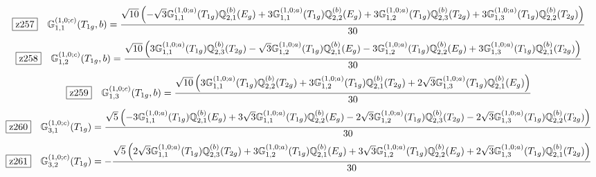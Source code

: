 \documentclass[fleqn,10pt,landscape]{jsarticle}
\begin{document}
\begin{dmath*}
\hspace*{3mm}\fbox{z257}\quad \mathbb{G}_{1,1}^{(1,0;c)}(T_{1g},b)=\frac{\sqrt{10} \left(- \sqrt{3} \mathbb{G}_{1,1}^{(1,0;a)}(T_{1g}) \mathbb{Q}_{2,1}^{(b)}(E_{g}) + 3 \mathbb{G}_{1,1}^{(1,0;a)}(T_{1g}) \mathbb{Q}_{2,2}^{(b)}(E_{g}) + 3 \mathbb{G}_{1,2}^{(1,0;a)}(T_{1g}) \mathbb{Q}_{2,3}^{(b)}(T_{2g}) + 3 \mathbb{G}_{1,3}^{(1,0;a)}(T_{1g}) \mathbb{Q}_{2,2}^{(b)}(T_{2g})\right)}{30}
\end{dmath*}
\begin{dmath*}
\hspace*{3mm}\fbox{z258}\quad \mathbb{G}_{1,2}^{(1,0;c)}(T_{1g},b)=\frac{\sqrt{10} \left(3 \mathbb{G}_{1,1}^{(1,0;a)}(T_{1g}) \mathbb{Q}_{2,3}^{(b)}(T_{2g}) - \sqrt{3} \mathbb{G}_{1,2}^{(1,0;a)}(T_{1g}) \mathbb{Q}_{2,1}^{(b)}(E_{g}) - 3 \mathbb{G}_{1,2}^{(1,0;a)}(T_{1g}) \mathbb{Q}_{2,2}^{(b)}(E_{g}) + 3 \mathbb{G}_{1,3}^{(1,0;a)}(T_{1g}) \mathbb{Q}_{2,1}^{(b)}(T_{2g})\right)}{30}
\end{dmath*}
\begin{dmath*}
\hspace*{3mm}\fbox{z259}\quad \mathbb{G}_{1,3}^{(1,0;c)}(T_{1g},b)=\frac{\sqrt{10} \left(3 \mathbb{G}_{1,1}^{(1,0;a)}(T_{1g}) \mathbb{Q}_{2,2}^{(b)}(T_{2g}) + 3 \mathbb{G}_{1,2}^{(1,0;a)}(T_{1g}) \mathbb{Q}_{2,1}^{(b)}(T_{2g}) + 2 \sqrt{3} \mathbb{G}_{1,3}^{(1,0;a)}(T_{1g}) \mathbb{Q}_{2,1}^{(b)}(E_{g})\right)}{30}
\end{dmath*}
\begin{dmath*}
\hspace*{3mm}\fbox{z260}\quad \mathbb{G}_{3,1}^{(1,0;c)}(T_{1g})=\frac{\sqrt{5} \left(- 3 \mathbb{G}_{1,1}^{(1,0;a)}(T_{1g}) \mathbb{Q}_{2,1}^{(b)}(E_{g}) + 3 \sqrt{3} \mathbb{G}_{1,1}^{(1,0;a)}(T_{1g}) \mathbb{Q}_{2,2}^{(b)}(E_{g}) - 2 \sqrt{3} \mathbb{G}_{1,2}^{(1,0;a)}(T_{1g}) \mathbb{Q}_{2,3}^{(b)}(T_{2g}) - 2 \sqrt{3} \mathbb{G}_{1,3}^{(1,0;a)}(T_{1g}) \mathbb{Q}_{2,2}^{(b)}(T_{2g})\right)}{30}
\end{dmath*}
\begin{dmath*}
\hspace*{3mm}\fbox{z261}\quad \mathbb{G}_{3,2}^{(1,0;c)}(T_{1g})=- \frac{\sqrt{5} \left(2 \sqrt{3} \mathbb{G}_{1,1}^{(1,0;a)}(T_{1g}) \mathbb{Q}_{2,3}^{(b)}(T_{2g}) + 3 \mathbb{G}_{1,2}^{(1,0;a)}(T_{1g}) \mathbb{Q}_{2,1}^{(b)}(E_{g}) + 3 \sqrt{3} \mathbb{G}_{1,2}^{(1,0;a)}(T_{1g}) \mathbb{Q}_{2,2}^{(b)}(E_{g}) + 2 \sqrt{3} \mathbb{G}_{1,3}^{(1,0;a)}(T_{1g}) \mathbb{Q}_{2,1}^{(b)}(T_{2g})\right)}{30}
\end{dmath*}
\end{document}
